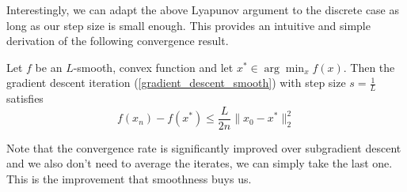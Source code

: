 Interestingly, we can adapt the above Lyapunov argument to the discrete case as long as our step size is small enough.
This provides an intuitive and simple derivation of the following convergence result.
\begin{theorem}\label{gradient_descent_convergence_smooth}
 Let $f$ be an $L$-smooth, convex function and let $x^*\in\arg\min_x f(x)$. 
 Then the gradient descent iteration (\ref{gradient_descent_smooth}) with
 step size $s = \frac{1}{L}$ satisfies
 \begin{equation}
  f(x_n) - f(x^*) \leq \frac{L}{2n}\|x_0 - x^*\|_2^2
 \end{equation}

\end{theorem}
 Note that the convergence rate is significantly improved over subgradient descent and we also
 don't need to average the iterates, we can simply take the last one. This is the improvement that
 smoothness buys us.
